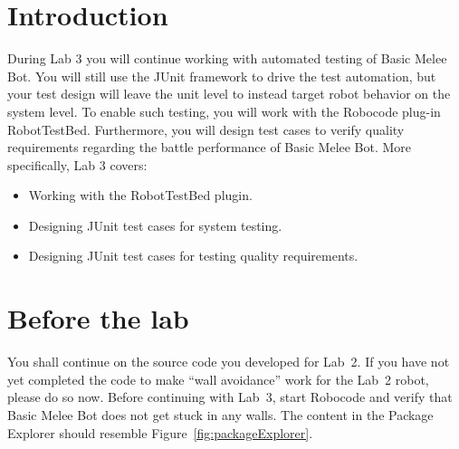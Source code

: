 \documentclass{scrreprt}
\begin{document}
\chapter{Introduction}
During Lab 3 you will continue working with automated testing of Basic Melee Bot. You will still use the JUnit framework to drive the test automation, but your test design will leave the unit level to instead target robot behavior on the system level. To enable such testing, you will work with the Robocode plug-in RobotTestBed. Furthermore, you will design test cases to verify quality requirements regarding the battle performance of Basic Melee Bot. More specifically, Lab 3 covers:

\begin{itemize}
\item Working with the RobotTestBed plugin.
\item Designing JUnit test cases for system testing.
\item Designing JUnit test cases for testing quality requirements.
\end{itemize}

\chapter{Before the lab}
You shall continue on the source code you developed for Lab~2. If you have not yet completed the code to make ``wall avoidance'' work for the Lab~2 robot, please do so now. Before continuing with Lab~3, start Robocode and verify that Basic Melee Bot does not get stuck in any walls. The content in the Package Explorer should resemble Figure~\ref{fig:packageExplorer}.
\end{document}
